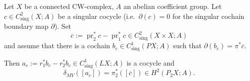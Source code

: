 \documentclass[10pt,a4paper]{amsart}
\newcommand{\boundary}[1]{\partial#1}
\DeclareMathOperator{\pr}{pr}
\DeclareMathOperator{\sing}{sing}
\begin{document}
\begin{proposition}\label{prop:MV_cocycle}
  Let $X$ be a connected CW-complex, $A$ an abelian coefficient group. Let $c\in
  C^2_{\sing}(X;A)$ be a singular cocycle (i.e.~$\boundary(c)=0$ for the
  singular cochain boundary map $\partial$). Set
  \begin{equation*}
    \overline c:= \pr_2^*c-
    \pr_1^*c \in C^2_{\sing}(X\times X; A)
  \end{equation*}
  and assume that there is a cochain $b_c\in
  C^1_{\sing}(PX;A)$ such that $\partial(b_c) = \pi^*\overline c$.

  Then $a_c:= r_1^*b_c-r_2^*b_c\in C^1_{\sing}(LX;A)$ is a cocycle and
  \begin{equation*}
    \delta_{MV}([a_c]) = \pi_2^*([\overline c]) \in H^2(P_2X;A).
  \end{equation*}
\end{proposition}
\end{document}
